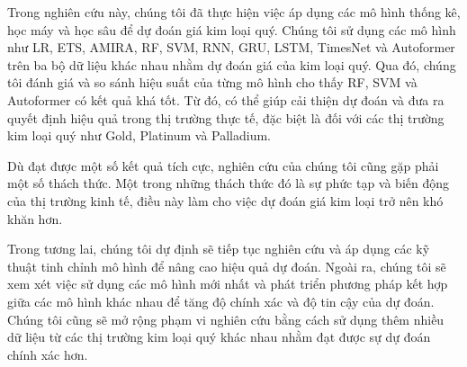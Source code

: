 Trong nghiên cứu này, chúng tôi đã thực hiện việc áp dụng các mô hình thống kê, học máy và học sâu để dự đoán giá kim loại quý. Chúng tôi sử dụng các mô hình như LR, ETS, AMIRA, RF, SVM, RNN, GRU, LSTM, TimesNet và Autoformer trên ba bộ dữ liệu khác nhau nhằm dự đoán giá của kim loại quý. Qua đó, chúng tôi đánh giá và so sánh hiệu suất của từng mô hình cho thấy RF, SVM và Autoformer có kết quả khá tốt. Từ đó, có thể giúp cải thiện dự đoán và đưa ra quyết định hiệu quả trong thị trường thực tế, đặc biệt là đối với các thị trường kim loại quý như Gold, Platinum và Palladium.

Dù đạt được một số kết quả tích cực, nghiên cứu của chúng tôi cũng gặp phải một số thách thức. Một trong những thách thức đó là sự phức tạp và biến động của thị trường kinh tế, điều này làm cho việc dự đoán giá kim loại trở nên khó khăn hơn.

Trong tương lai, chúng tôi dự định sẽ tiếp tục nghiên cứu và áp dụng các kỹ thuật tinh chỉnh mô hình để nâng cao hiệu quả dự đoán. Ngoài ra, chúng tôi sẽ xem xét việc sử dụng các mô hình mới nhất và phát triển phương pháp kết hợp giữa các mô hình khác nhau để tăng độ chính xác và độ tin cậy của dự đoán. Chúng tôi cũng sẽ mở rộng phạm vi nghiên cứu bằng cách sử dụng thêm nhiều dữ liệu từ các thị trường kim loại quý khác nhau nhằm đạt được sự dự đoán chính xác hơn.